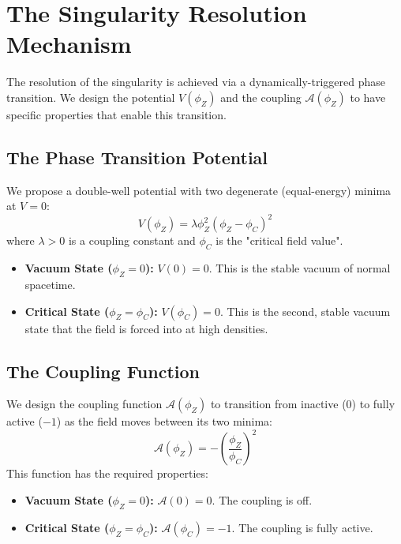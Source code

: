 \documentclass[12pt, a4paper]{article}
\newcommand{\phiZ}{\phi_Z}
\newcommand{\Aphi}{\mathcal{A}(\phiZ)}
\newcommand{\Vphi}{V(\phiZ)}
\newcommand{\phiC}{\phi_C}
\begin{document}
\section{The Singularity Resolution Mechanism}

The resolution of the singularity is achieved via a dynamically-triggered phase transition. We design the potential $\Vphi$ and the coupling $\Aphi$ to have specific properties that enable this transition.

\subsection{The Phase Transition Potential}
We propose a double-well potential with two degenerate (equal-energy) minima at $V=0$:
\begin{equation}
\Vphi = \lambda \phiZ^2 (\phiZ - \phiC)^2
\end{equation}
where $\lambda > 0$ is a coupling constant and $\phiC$ is the "critical field value".
\begin{itemize}
    \item \textbf{Vacuum State ($\phiZ=0$):} $V(0) = 0$. This is the stable vacuum of normal spacetime.
    \item \textbf{Critical State ($\phiZ=\phiC$):} $V(\phiC) = 0$. This is the second, stable vacuum state that the field is forced into at high densities.
\end{itemize}

\subsection{The Coupling Function}
We design the coupling function $\Aphi$ to transition from inactive (0) to fully active ($-1$) as the field moves between its two minima:
\begin{equation}
\Aphi = - \left( \frac{\phiZ}{\phiC} \right)^2
\end{equation}
This function has the required properties:
\begin{itemize}
    \item \textbf{Vacuum State ($\phiZ=0$):} $\mathcal{A}(0) = 0$. The coupling is off.
    \item \textbf{Critical State ($\phiZ=\phiC$):} $\mathcal{A}(\phiC) = -1$. The coupling is fully active.
\end{itemize}
\end{document}

